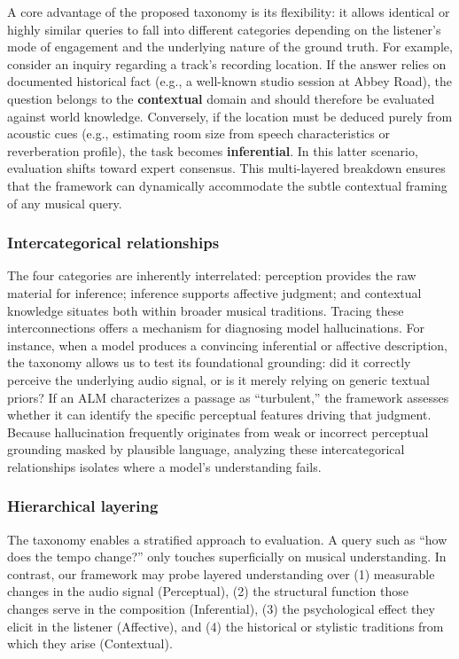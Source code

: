 \documentclass[conference,a4paper]{APSIPA2026}
\begin{document}
A core advantage of the proposed taxonomy is its flexibility: it allows identical or highly similar queries to fall into different categories depending on the listener's mode of engagement and the underlying nature of the ground truth. For example, consider an inquiry regarding a track's recording location. If the answer relies on documented historical fact (e.g., a well-known studio session at Abbey Road), the question belongs to the \textbf{contextual} domain and should therefore be evaluated against world knowledge. Conversely, if the location must be deduced purely from acoustic cues (e.g., estimating room size from speech characteristics or reverberation profile), the task becomes \textbf{inferential}. In this latter scenario, evaluation shifts toward expert consensus. This multi-layered breakdown ensures that the framework can dynamically accommodate the subtle contextual framing of any musical query.

\subsubsection{Intercategorical relationships}

The four categories are inherently interrelated: perception provides the raw material for inference; inference supports affective judgment; and contextual knowledge situates both within broader musical traditions. Tracing these interconnections offers a mechanism for diagnosing model hallucinations. For instance, when a model produces a convincing inferential or affective description, the taxonomy allows us to test its foundational grounding: did it correctly perceive the underlying audio signal, or is it merely relying on generic textual priors? If an ALM characterizes a passage as ``turbulent,'' the framework assesses whether it can identify the specific perceptual features driving that judgment. Because hallucination frequently originates from weak or incorrect perceptual grounding masked by plausible language, analyzing these intercategorical relationships isolates where a model's understanding fails.

\subsubsection{Hierarchical layering}

The taxonomy enables a stratified approach to evaluation. A query such as ``how does the tempo change?'' only touches superficially on musical understanding. In contrast, our framework may probe layered understanding over (1) measurable changes in the audio signal (Perceptual), (2) the structural function those changes serve in the composition (Inferential), (3) the psychological effect they elicit in the listener (Affective), and (4) the historical or stylistic traditions from which they arise (Contextual).
\end{document}
